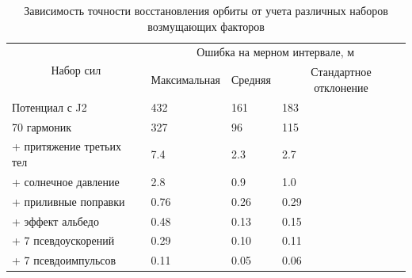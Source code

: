 \begin{table}[h!]
    \caption{Зависимость точности восстановления орбиты от учета различных наборов
    возмущающих факторов}
    \centering
    \renewcommand{\arraystretch}{1.5}
    \begin{tabular}{|l|lll|}
    \hline
    \multicolumn{1}{|c|}{\multirow{2}{*}{Набор сил}} & \multicolumn{3}{c|}{Ошибка на мерном интервале, м}                                                             \\ \cline{2-4} 
    \multicolumn{1}{|c|}{}                           & \multicolumn{1}{c|}{Максимальная} & \multicolumn{1}{c|}{Средняя} & \multicolumn{1}{c|}{Стандартное отклонение} \\ \hline
    Потенциал с J2                                   & \multicolumn{1}{l|}{432}          & \multicolumn{1}{l|}{161}     & 183                                         \\ \hline
    70 гармоник                                      & \multicolumn{1}{l|}{327}          & \multicolumn{1}{l|}{96}      & 115                                         \\ \hline
    + притяжение третьих тел                         & \multicolumn{1}{l|}{7.4}          & \multicolumn{1}{l|}{2.3}     & 2.7                                         \\ \hline
    + солнечное давление                             & \multicolumn{1}{l|}{2.8}          & \multicolumn{1}{l|}{0.9}     & 1.0                                         \\ \hline
    + приливные поправки                             & \multicolumn{1}{l|}{0.76}         & \multicolumn{1}{l|}{0.26}    & 0.29                                        \\ \hline
    + эффект альбедо                                 & \multicolumn{1}{l|}{0.48}         & \multicolumn{1}{l|}{0.13}    & 0.15                                        \\ \hline
    + 7 псевдоускорений                              & \multicolumn{1}{l|}{0.29}         & \multicolumn{1}{l|}{0.10}    & 0.11                                        \\ \hline
    + 7 псевдоимпульсов                              & \multicolumn{1}{l|}{0.11}         & \multicolumn{1}{l|}{0.05}    & 0.06                                        \\ \hline
    \end{tabular}
    \label{tab:lageos2_exp}
\end{table}

